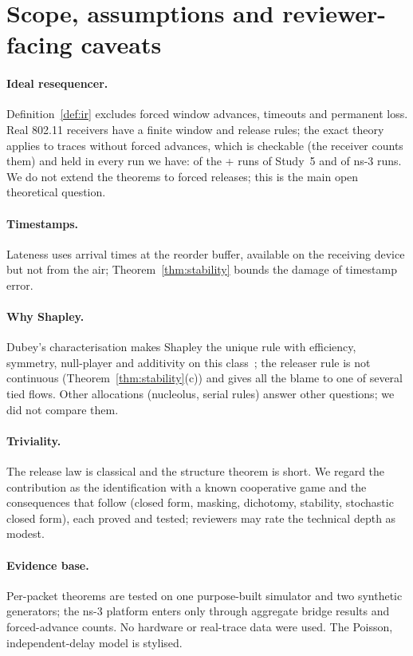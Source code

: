 \documentclass[11pt]{article}
\theoremstyle{definition}
\begin{document}
\section{Scope, assumptions and reviewer-facing caveats}\label{sec:scope}
\paragraph{Ideal resequencer.} Definition~\ref{def:ir} excludes forced window advances, timeouts and permanent loss. Real 802.11 receivers have a finite window and release rules; the exact theory applies to traces without forced advances, which is checkable (the receiver counts them) and held in every run we have: \FvForcedRuns{} of the \FvSimRuns{}+\FvGenRuns{} runs of Study~5 and \FvNsForced{} of \FvNsRuns{} ns-3 runs. We do not extend the theorems to forced releases; this is the main open theoretical question.
\paragraph{Timestamps.} Lateness uses arrival times at the reorder buffer, available on the receiving device but not from the air; Theorem~\ref{thm:stability} bounds the damage of timestamp error.
\paragraph{Why Shapley.} Dubey's characterisation makes Shapley the unique rule with efficiency, symmetry, null-player and additivity on this class~\cite{dubey1982airport}; the releaser rule is not continuous (Theorem~\ref{thm:stability}(c)) and gives all the blame to one of several tied flows. Other allocations (nucleolus, serial rules) answer other questions; we did not compare them.
\paragraph{Triviality.} The release law is classical and the structure theorem is short. We regard the contribution as the identification with a known cooperative game and the consequences that follow (closed form, masking, dichotomy, stability, stochastic closed form), each proved and tested; reviewers may rate the technical depth as modest.
\paragraph{Evidence base.} Per-packet theorems are tested on one purpose-built simulator and two synthetic generators; the ns-3 platform enters only through aggregate bridge results and forced-advance counts. No hardware or real-trace data were used. The Poisson, independent-delay model is stylised.
\end{document}
